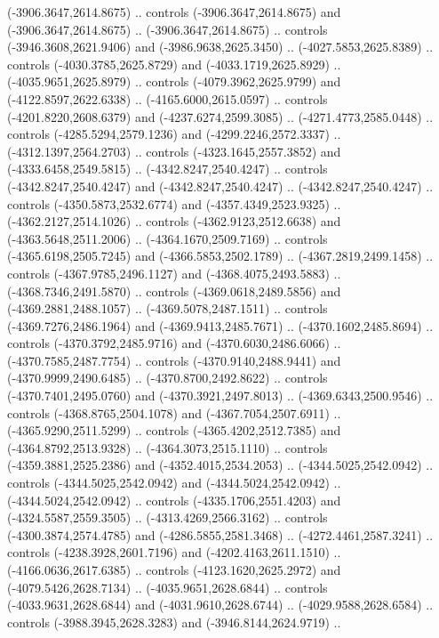 \begin{scope}[shift={(430.80877,-416.69739)}]
\begin{scope}[shift={(4537.8125,-1856.4436)}]
\begin{scope}[shift={(-148.39113,-28.14259)}]
        (-3906.3647,2614.8675) .. controls (-3906.3647,2614.8675) and
        (-3906.3647,2614.8675) .. (-3906.3647,2614.8675) .. controls
        (-3946.3608,2621.9406) and (-3986.9638,2625.3450) .. (-4027.5853,2625.8389) ..
        controls (-4030.3785,2625.8729) and (-4033.1719,2625.8929) ..
        (-4035.9651,2625.8979) .. controls (-4079.3962,2625.9799) and
        (-4122.8597,2622.6338) .. (-4165.6000,2615.0597) .. controls
        (-4201.8220,2608.6379) and (-4237.6274,2599.3085) .. (-4271.4773,2585.0448) ..
        controls (-4285.5294,2579.1236) and (-4299.2246,2572.3337) ..
        (-4312.1397,2564.2703) .. controls (-4323.1645,2557.3852) and
        (-4333.6458,2549.5815) .. (-4342.8247,2540.4247) .. controls
        (-4342.8247,2540.4247) and (-4342.8247,2540.4247) .. (-4342.8247,2540.4247) ..
        controls (-4350.5873,2532.6774) and (-4357.4349,2523.9325) ..
        (-4362.2127,2514.1026) .. controls (-4362.9123,2512.6638) and
        (-4363.5648,2511.2006) .. (-4364.1670,2509.7169) .. controls
        (-4365.6198,2505.7245) and (-4366.5853,2502.1789) .. (-4367.2819,2499.1458) ..
        controls (-4367.9785,2496.1127) and (-4368.4075,2493.5883) ..
        (-4368.7346,2491.5870) .. controls (-4369.0618,2489.5856) and
        (-4369.2881,2488.1057) .. (-4369.5078,2487.1511) .. controls
        (-4369.7276,2486.1964) and (-4369.9413,2485.7671) .. (-4370.1602,2485.8694) ..
        controls (-4370.3792,2485.9716) and (-4370.6030,2486.6066) ..
        (-4370.7585,2487.7754) .. controls (-4370.9140,2488.9441) and
        (-4370.9999,2490.6485) .. (-4370.8700,2492.8622) .. controls
        (-4370.7401,2495.0760) and (-4370.3921,2497.8013) .. (-4369.6343,2500.9546) ..
        controls (-4368.8765,2504.1078) and (-4367.7054,2507.6911) ..
        (-4365.9290,2511.5299) .. controls (-4365.4202,2512.7385) and
        (-4364.8792,2513.9328) .. (-4364.3073,2515.1110) .. controls
        (-4359.3881,2525.2386) and (-4352.4015,2534.2053) .. (-4344.5025,2542.0942) ..
        controls (-4344.5025,2542.0942) and (-4344.5024,2542.0942) ..
        (-4344.5024,2542.0942) .. controls (-4335.1706,2551.4203) and
        (-4324.5587,2559.3505) .. (-4313.4269,2566.3162) .. controls
        (-4300.3874,2574.4785) and (-4286.5855,2581.3468) .. (-4272.4461,2587.3241) ..
        controls (-4238.3928,2601.7196) and (-4202.4163,2611.1510) ..
        (-4166.0636,2617.6385) .. controls (-4123.1620,2625.2972) and
        (-4079.5426,2628.7134) .. (-4035.9651,2628.6844) .. controls
        (-4033.9631,2628.6844) and (-4031.9610,2628.6744) .. (-4029.9588,2628.6584) ..
        controls (-3988.3945,2628.3283) and (-3946.8144,2624.9719) ..

\end{scope}
\end{scope}
\end{scope}
